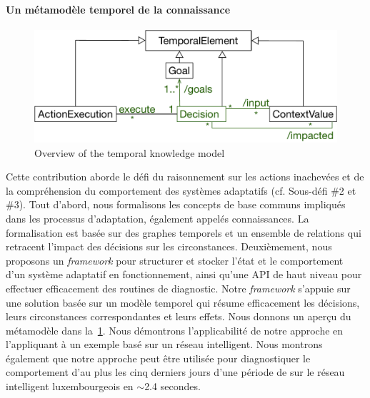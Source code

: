 \paragraph{Un métamodèle temporel de la connaissance}
\begin{figure}
	\centering
	\includegraphics[width=0.6\linewidth]{img/chapt-intro/approach/tkm-overview}
	\caption{Overview of the temporal knowledge model}
	\label{fig_french_contrib_tkm}
\end{figure}

%
Cette contribution aborde le défi du raisonnement sur les actions inachevées et de la compréhension du comportement des systèmes adaptatifs (cf. Sous-défi \#2 et \#3). 
Tout d'abord, nous formalisons les concepts de base communs impliqués dans les processus d'adaptation, également appelés connaissances. 
La formalisation est basée sur des graphes temporels et un ensemble de relations qui retracent l'impact des décisions sur les circonstances. 
Deuxièmement, nous proposons un \textit{framework} pour structurer et stocker l'état et le comportement d'un système adaptatif en fonctionnement, ainsi qu'une API de haut niveau pour effectuer efficacement des routines de diagnostic. 
Notre \textit{framework} s'appuie sur une solution basée sur un modèle temporel qui résume efficacement les décisions, leurs circonstances correspondantes et leurs effets. 
Nous donnons un aperçu du métamodèle dans la~\cref{fig_french_contrib_tkm}. 
Nous démontrons l'applicabilité de notre approche en l'appliquant à un exemple basé sur un réseau intelligent. 
Nous montrons également que notre approche peut être utilisée pour diagnostiquer le comportement d'au plus les cinq derniers jours d'une période de sur le réseau intelligent luxembourgeois en $\sim$2.4 secondes.

